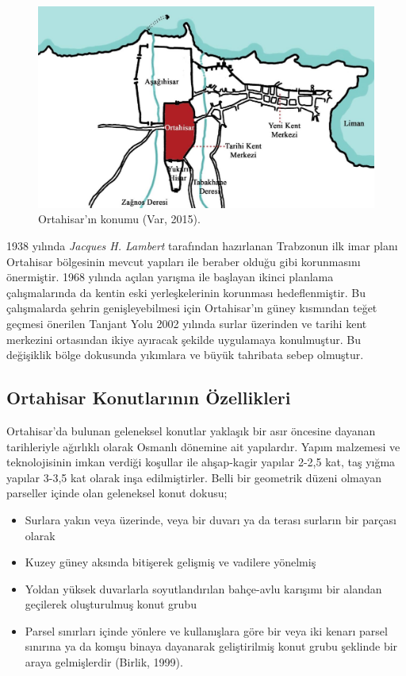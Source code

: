\documentclass[12pt,turkish,a4paperpaper,]{report}
\providecommand{\tightlist}{%
  \setlength{\itemsep}{0pt}\setlength{\parskip}{0pt}}
\begin{document}
\begin{figure}
\centering
\includegraphics[width=1\textwidth,height=\textheight]{source/figures/ortahisar.jpg}
\caption{Ortahisar'ın konumu (Var, 2015).}
\end{figure}

1938 yılında \emph{Jacques H. Lambert} tarafından hazırlanan Trabzonun
ilk imar planı Ortahisar bölgesinin mevcut yapıları ile beraber olduğu
gibi korunmasını önermiştir. 1968 yılında açılan yarışma ile başlayan
ikinci planlama çalışmalarında da kentin eski yerleşkelerinin korunması
hedeflenmiştir. Bu çalışmalarda şehrin genişleyebilmesi için
Ortahisar'ın güney kısmından teğet geçmesi önerilen Tanjant Yolu 2002
yılında surlar üzerinden ve tarihi kent merkezini ortasından ikiye
ayıracak şekilde uygulamaya konulmuştur. Bu değişiklik bölge dokusunda
yıkımlara ve büyük tahribata sebep olmuştur.

\hypertarget{ortahisar-konutlarux131nux131n-uxf6zellikleri}{%
\subsection{Ortahisar Konutlarının
Özellikleri}\label{ortahisar-konutlarux131nux131n-uxf6zellikleri}}

Ortahisar'da bulunan geleneksel konutlar yaklaşık bir asır öncesine
dayanan tarihleriyle ağırlıklı olarak Osmanlı dönemine ait yapılardır.
Yapım malzemesi ve teknolojisinin imkan verdiği koşullar ile ahşap-kagir
yapılar 2-2,5 kat, taş yığma yapılar 3-3,5 kat olarak inşa
edilmiştirler. Belli bir geometrik düzeni olmayan parseller içinde olan
geleneksel konut dokusu;

\begin{itemize}
\tightlist
\item
  Surlara yakın veya üzerinde, veya bir duvarı ya da terası surların bir
  parçası olarak
\item
  Kuzey güney aksında bitişerek gelişmiş ve vadilere yönelmiş
\item
  Yoldan yüksek duvarlarla soyutlandırılan bahçe-avlu karışımı bir
  alandan geçilerek oluşturulmuş konut grubu
\item
  Parsel sınırları içinde yönlere ve kullanışlara göre bir veya iki
  kenarı parsel sınırına ya da komşu binaya dayanarak geliştirilmiş
  konut grubu şeklinde bir araya gelmişlerdir (Birlik, 1999). 
\end{itemize}
\end{document}
